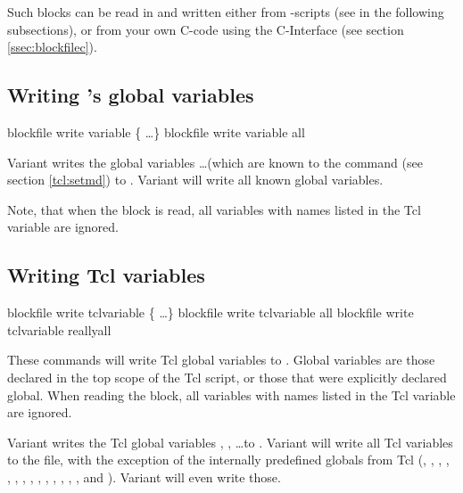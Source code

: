 Such blocks can be read in and written either from \es-scripts (see in
the following subsections), or from your own C-code using the
C-Interface (see section \ref{ssec:blockfilec}).

\subsection{Writing \es's global variables}

\begin{essyntax}
   blockfile  
  write variable \{  \dots \}
   blockfile  write variable all
\end{essyntax}

Variant  writes the global variables 
 \dots (which are known to the  command (see
section \vref{tcl:setmd}) to . Variant  will
write all known global variables.

Note, that when the block is read, all variables with names listed in
the Tcl variable  are ignored.

\subsection{Writing Tcl variables}

\begin{essyntax}
   blockfile  write tclvariable \{
    \dots \}
   blockfile  write tclvariable all
   blockfile  write tclvariable reallyall
\end{essyntax}

These commands will write Tcl global variables to .
Global variables are those declared in the top scope of the Tcl
script, or those that were explicitly declared global.  When reading
the block, all variables with names listed in the Tcl variable
 are ignored.

Variant  writes the Tcl global variables ,
, \dots to . Variant  will write
all Tcl variables to the file, with the exception of the internally
predefined globals from Tcl (, ,
, , , ,
, , , ,
, , , ,
 and ). Variant  will
even write those.

